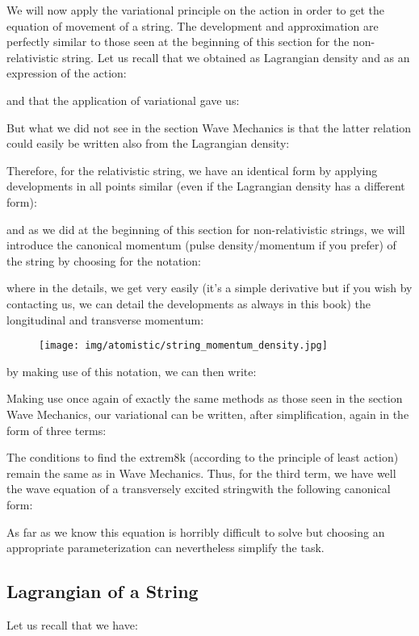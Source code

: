 	We will now apply the variational principle on the action in order to get the equation of movement of a string. The development and approximation are perfectly similar to those seen at the beginning of this section for the non-relativistic string. Let us recall that we obtained as Lagrangian density and as an expression of the action:
	
	and that the application of variational gave us:
	
	But what we did not see in the section Wave Mechanics is that the latter relation could easily be written also from the Lagrangian density:
	
	Therefore, for the relativistic string, we have an identical form by applying developments in all points similar (even if the Lagrangian density has a different form):
	
	and as we did at the beginning of this section for non-relativistic strings, we will introduce the canonical momentum (pulse density/momentum if you prefer) of the string by choosing for the notation:
	
	where in the details, we get very easily (it's a simple derivative but if you wish by contacting us, we can detail the developments as always in this book) the longitudinal and transverse momentum:
	
	\begin{figure}[H]
		\begin{center}
		\texttt{[image: img/atomistic/string\_momentum\_density.jpg]}
		\end{center}	
	\end{figure}
	by making use of this notation, we can then write:
	
	Making use once again of exactly the same methods as those seen in the section Wave Mechanics, our variational can be written, after simplification, again in the form of three terms:
	
	The conditions to find the extrem8k (according to the principle of least action) remain the same as in Wave Mechanics. Thus, for the third term, we have well the wave equation of a transversely excited stringwith the following canonical form:
	
	As far as we know this equation is horribly difficult to solve but choosing an appropriate parameterization can nevertheless simplify the task.
	
	\subsection{Lagrangian of a String}
	Let us recall that we have:
	
